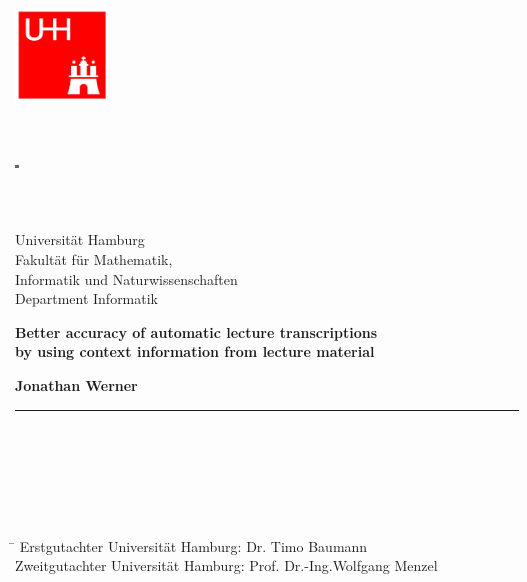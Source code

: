 \documentclass[]{article}
\date{}
\begin{document}
\begin{titlepage}

  \setcounter{page}{-1}

		\begin{minipage}[b]{25mm}
			\includegraphics[width=25mm,clip]{images/logo_uhh}
		\end{minipage}
		\begin{minipage}[b]{2mm}
			\includegraphics[width=1mm,height=24mm]{images/greypixel}
		\end{minipage}
		\begin{minipage}[b]{12 cm}
			{\sffamily
				{\Large Universität Hamburg } \\
				Fakultät für Mathematik,\\
				Informatik und Naturwissenschaften \\
				Department Informatik \\
			}
		\end{minipage}

	\vfill

	\begin{center}
		\vspace{14mm}
		\noindent \textbf{\large
		  Better accuracy of automatic lecture transcriptions \\ by using context information from lecture material
		}
		\vspace{10mm}

	\end{center}

	\vfill

	\noindent \textbf{Jonathan Werner} \\
	\noindent \rule{\textwidth}{0.4mm}
	 \\
	 \\
	 \\
	 \\
	 \\
	\begin{tabbing}
	\hspace{20em} \=  \kill
	Erstgutachter Universität Hamburg: \> Dr. Timo Baumann \\
	Zweitgutachter Universität Hamburg: \> Prof. Dr.-Ing.Wolfgang Menzel \\


\end{tabbing}
\end{titlepage}
\end{document}
